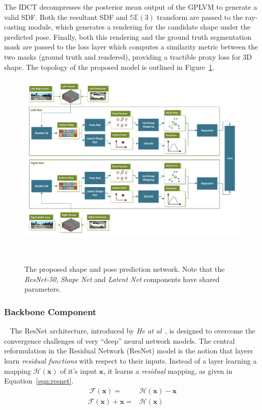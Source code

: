 The IDCT decompresses the posterior mean output of the GPLVM to generate a valid SDF\@. Both the 
resultant SDF and \( \mathbb{SE}(3) \) transform are passed to the ray-casting module, which generates 
a rendering for the candidate shape under the predicted pose. Finally, both this rendering and the ground truth 
segmentation mask are passed to the loss layer which computes a similarity metric between the two masks (ground truth and rendered), 
providing a tractible proxy loss for 3D shape. The topology of the proposed model is outlined in Figure~\ref{figure:spp_pipeline}.
\begin{landscape}
  \begin{figure}[!htbp]
    \centering
    \includegraphics[width=.8\linewidth]{figures/spp/model.pdf}
    \caption[Shape and Pose Prediction Network]{The proposed shape and pose prediction network. 
    Note that the \textit{ResNet-50}, \textit{Shape Net} and \textit{Latent Net} components have 
    shared parameters.}
~\label{figure:spp_pipeline}
  \end{figure}
\end{landscape}

\subsubsection{Backbone Component}
~\label{subsub:spp_neural_backbone}
The ResNet architecture, introduced by \textit{He at al}~\cite{He2015}, is designed to overcome the 
convergence challenges of very ``deep'' neural network models. The central reformulation in the 
Residual Network (ResNet) model is the notion that layers learn \textit{residual functions} with respect to 
their inputs. Instead of a layer learning a mapping \( \mathcal{H}(\bm{x}) \) of it's input \( \bm{x} \), 
it learns a \textit{residual} mapping, as given in Equation~\ref{eqn:resnet}.
\begin{align}
~\label{eqn:resnet}
  \mathcal{F}(\bm{x}) ={}& \mathcal{H}(\bm{x}) - \bm{x}\\
  \mathcal{F}(\bm{x}) + \bm{x} ={}& \mathcal{H}(\bm{x})
\end{align}

